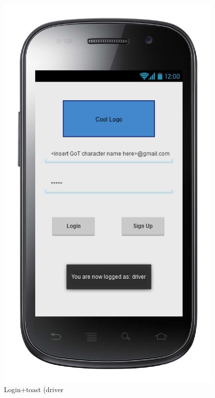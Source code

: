 \begin{center}
\begin{figure} [h]
  	  \includegraphics[scale=0.5]{ui/Login + toast (driver).png}
\caption{Login+toast (driver}
  
	\end{figure}
\end{center}

